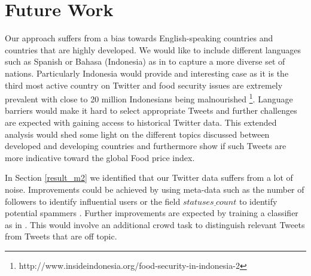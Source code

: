 \section{Future Work }

Our approach suffers from a bias towards English-speaking countries and countries that are highly developed. We would like to include different languages such as Spanish or Bahasa (Indonesia) as in \cite{ungp2013} to capture a more diverse set of nations. Particularly Indonesia would provide and interesting case as it is the third most active country on Twitter and food security issues are extremely prevalent with close to 20 million Indonesians being malnourished \footnote{http://www.insideindonesia.org/food-security-in-indonesia-2}. Language barriers would make it hard to select appropriate Tweets and further challenges are expected with gaining access to historical Twitter data. This extended analysis would shed some light on the different topics discussed between developed and developing countries and furthermore show if such Tweets are more indicative toward the global Food price index. 

In Section \ref{result_m2} we identified that our Twitter data suffers from a lot of noise. Improvements could be achieved by using meta-data such as the number of followers to identify influential users or the field $statuses \underline{} count$ to identify potential spammers \cite{mowbray10}. Further improvements are expected by training a classifier as in \cite{AbbarMW14}. This would involve an additional crowd task to distinguish relevant Tweets from Tweets that are off topic. 




 
